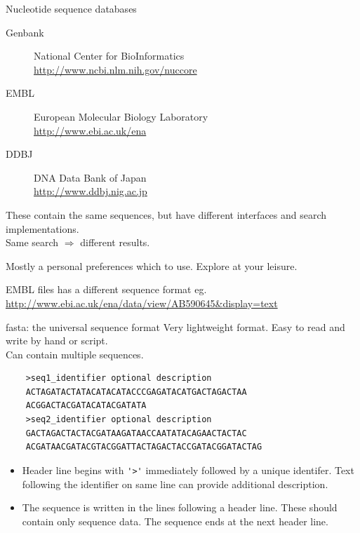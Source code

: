 \documentclass[pdf]{beamer}
\begin{document}
\begin{frame}{Nucleotide sequence databases}
  \begin{description}
    \item[Genbank] National Center for BioInformatics\\
      \url{http://www.ncbi.nlm.nih.gov/nuccore}
    \item[EMBL] European Molecular Biology Laboratory\\
      \url{http://www.ebi.ac.uk/ena}
    \item[DDBJ] DNA Data Bank of Japan\\
      \url{http://www.ddbj.nig.ac.jp}
  \end{description}
  
  These contain the same sequences, but have different interfaces and
  search implementations.\\
  Same search $\Rightarrow$ different results.

  Mostly a personal preferences which to use. Explore at your leisure.

  EMBL files has a different sequence format eg.\\
  {\footnotesize
  \url{http://www.ebi.ac.uk/ena/data/view/AB590645&display=text}
  }
\end{frame}

\begin{frame}[fragile]{fasta: the universal sequence format}
  Very lightweight format. Easy to read and write by hand or script.\\
  Can contain multiple sequences.
  \begin{verbatim}
    >seq1_identifier optional description
    ACTAGATACTATACATACATACCCGAGATACATGACTAGACTAA
    ACGGACTACGATACATACGATATA
    >seq2_identifier optional description
    GACTAGACTACTACGATAAGATAACCAATATACAGAACTACTAC
    ACGATAACGATACGTACGGATTACTAGACTACCGATACGGATACTAG
  \end{verbatim}
  {\small
  \begin{itemize}
    \item Header line begins with \verb|'>'| immediately followed by a unique identifer.
      Text following the identifier on same line can provide additional description.
    \item The sequence is written in the lines following a header line. These should
      contain only sequence data. The sequence ends at the next header line.
  \end{itemize}
  }
\end{frame}
\end{document}
